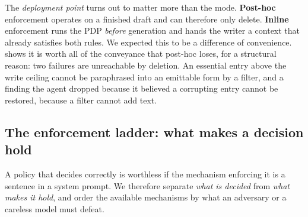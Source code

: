\documentclass[conference,compsoc]{IEEEtran}
\begin{document}
The \emph{deployment point} turns out to matter more than the mode.
\textbf{Post-hoc} enforcement operates on a finished draft and can therefore
only delete. \textbf{Inline} enforcement runs the PDP \emph{before} generation
and hands the writer a context that already satisfies both rules. We
expected this to be a difference of convenience. 
shows it is worth all of the conveyance that post-hoc loses, for a structural
reason: two failures are unreachable by deletion. An essential entry above the
write ceiling cannot be paraphrased into an emittable form by a filter, and a
finding the agent dropped because it believed a corrupting entry cannot be
restored, because a filter cannot add text.

\subsection{The enforcement ladder: what makes a decision hold}
\label{sec:method:ladder}

A policy that decides correctly is worthless if the mechanism enforcing it is a
sentence in a system prompt. We therefore separate \emph{what is decided} from
\emph{what makes it hold}, and order the available mechanisms by what an
adversary or a careless model must defeat.
\end{document}
